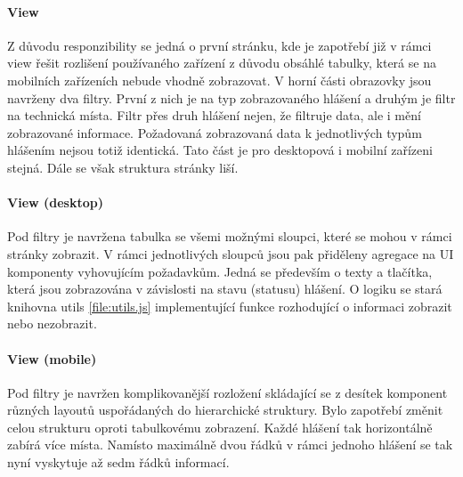 \documentclass[thesis=M,czech]{FITthesis}[2012/06/26]
\begin{document}
\paragraph{View}
Z důvodu responzibility se jedná o první stránku, kde je zapotřebí již v rámci view řešit rozlišení používaného zařízení z důvodu obsáhlé tabulky, která se na mobilních zařízeních nebude vhodně zobrazovat. V horní části obrazovky jsou navrženy dva filtry. První z nich je na typ zobrazovaného hlášení a druhým je filtr na technická místa. Filtr přes druh hlášení nejen, že filtruje data, ale i mění zobrazované informace. Požadovaná zobrazovaná data k jednotlivých typům hlášením nejsou totiž identická. Tato část je pro desktopová i mobilní zařízeni stejná. Dále se však struktura stránky liší. 
\paragraph{View (desktop)}
Pod filtry je navržena tabulka se všemi možnými sloupci, které se mohou v rámci stránky zobrazit. V rámci jednotlivých sloupců jsou pak přiděleny agregace na UI komponenty vyhovujícím požadavkům. Jedná se především o texty a tlačítka, která jsou zobrazována v závislosti na stavu (statusu) hlášení. O logiku se stará knihovna utils \ref{file:utils.js} implementující funkce rozhodující o informaci zobrazit nebo nezobrazit.
\paragraph{View (mobile)}
Pod filtry je navržen komplikovanější rozložení skládající se z desítek komponent různých layoutů uspořádaných do hierarchické struktury. Bylo zapotřebí změnit celou strukturu oproti tabulkovému zobrazení. Každé hlášení tak horizontálně zabírá více místa. Namísto maximálně dvou řádků v rámci jednoho hlášení se tak nyní vyskytuje až sedm řádků informací.
\end{document}
